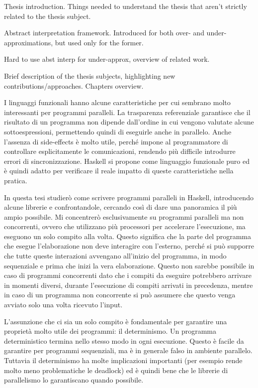 
Thesis introduction. Things needed to understand the thesis that aren't strictly related to the thesis subject.

Abstract interpretation framework. Introduced for both over- and under-approximations, but used only for the former.

Hard to use abst interp for under-approx, overview of related work.

Brief description of the thesis subjects, highlighting new contributions/approaches. Chapters overview.

I linguaggi funzionali hanno alcune caratteristiche per cui sembrano molto interessanti per programmi paralleli. La trasparenza referenziale garantisce che il risultato di un programma non dipende dall'ordine in cui vengono valutate alcune sottoespressioni, permettendo quindi di eseguirle anche in parallelo. Anche l'assenza di side-effects è molto utile, perché impone al programmatore di controllare esplicitamente le comunicazioni, rendendo più difficile introdurre errori di sincronizzazione.
Haskell si propone come linguaggio funzionale puro ed è quindi adatto per verificare il reale impatto di queste caratteristiche nella pratica.

In questa tesi studierò come scrivere programmi paralleli in Haskell, introducendo alcune librerie e confrontandole, cercando così di dare una panoramica il più ampio possibile. Mi concentrerò esclusivamente su programmi paralleli ma non concorrenti, ovvero che utilizzano più processori per accelerare l'esecuzione, ma eseguono un solo compito alla volta. Questo significa che la parte del programma che esegue l'elaborazione non deve interagire con l'esterno, perché si può supporre che tutte queste interazioni avvengano all'inizio del programma, in modo sequenziale e prima che inizi la vera elaborazione. Questo non sarebbe possibile in caso di programmi concorrenti dato che i compiti da eseguire potrebbero arrivare in momenti diversi, durante l'esecuzione di compiti arrivati in precedenza, mentre in caso di un programma non concorrente si può assumere che questo venga avviato solo una volta ricevuto l'input.

L'assunzione che ci sia un solo compito è fondamentale per garantire una proprietà molto utile dei programmi: il determinismo. Un programma deterministico termina nello stesso modo in ogni esecuzione. Questo è facile da garantire per programmi sequenziali, ma è in generale falso in ambiente parallelo. Tuttavia il determinismo ha molte implicazioni importanti (per esempio rende molto meno problematiche le deadlock) ed è quindi bene che le librerie di parallelismo lo garantiscano quando possibile.

